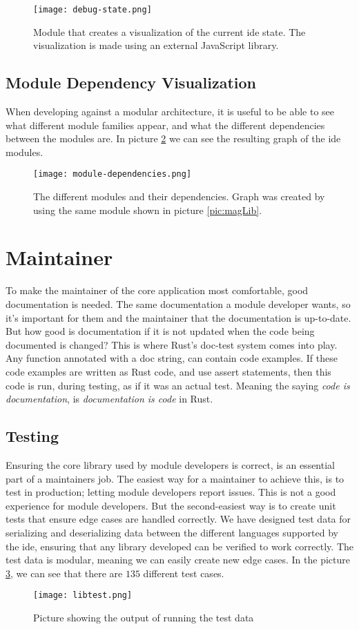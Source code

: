 \begin{figure}[H]
  \centering
  \texttt{[image: debug-state.png]}
  \caption{
    Module that creates a visualization of the current \gls*{ide} state. The
    visualization is made using an external JavaScript library.
  }
  \label{pic:debugState}
\end{figure}


\subsection{Module Dependency Visualization}

When developing against a modular architecture, it is useful to be able to see
what different module families appear, and what the different dependencies
between the modules are. In picture \ref{pic:modDep} we can see the resulting
graph of the \gls*{ide} modules.

\begin{figure}[H]
  \centering
  \texttt{[image: module-dependencies.png]}
  \caption{
    The different modules and their dependencies. Graph was created by using the
    same module shown in picture \ref{pic:magLib}.
  }
  \label{pic:modDep}
\end{figure}


\section{Maintainer}

To make the maintainer of the core application most comfortable, good
documentation is needed. The same documentation a module developer wants, so
it's important for them and the maintainer that the documentation is up-to-date.
But how good is documentation if it is not updated when the code being
documented is changed? This is where Rust's doc-test system comes into play. Any
function annotated with a doc string, can contain code examples. If these code
examples are written as Rust code, and use assert statements, then this code is
run, during testing, as if it was an actual test. Meaning the saying
\textit{code is documentation}, is \textit{documentation is code} in Rust.

\subsection{Testing}

Ensuring the core library used by module developers is correct, is an essential
part of a maintainers job. The easiest way for a maintainer to achieve this, is
to test in production; letting module developers report issues. This is not a
good experience for module developers. But the second-easiest way is to create
unit tests that ensure edge cases are handled correctly. We have designed test
data for serializing and deserializing data between the different languages
supported by the \gls*{ide}, ensuring that any library developed can be
verified to work correctly. The test data is modular, meaning we can easily
create new edge cases. In the picture \ref{pic:libTest}, we can see that there
are $135$ different test cases.

\begin{figure}
  \centering
  \texttt{[image: libtest.png]}
  \caption{Picture showing the output of running the test data}
  \label{pic:libTest}
\end{figure}
